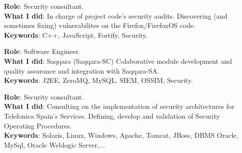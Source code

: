 \documentclass[]{resume}
\begin{document}
\begin{minipage}[t]{0.66\textwidth}
\textbf{Role}: Security consultant.\\
\textbf{What I did}: In charge of project code's security audits. Discovering (and sometimes fixing) vulnerabilites on the Firefox/FirefoxOS code.\\
\textbf{Keywords}: C++, JavaScript, Fortify, Security.
\sectionsep

\textbf{Role}: Software Engineer.\\
\textbf{What I did}: Saqqara (Saqqara-SC) Colaborative module development and quality assurance and integration with Saqqara-SA.\\
\textbf{Keywords}: J2EE, ZeroMQ, MySQL, SIEM, OSSIM, Security.
\sectionsep

\textbf{Role}: Security consultant.\\
\textbf{What I did}: Consulting on the implementation of security architectures for Telefonica Spain's Services. Defining, develop and validation of Security Operating Procedures.\\
\textbf{Keywords}: Solaris, Linux, Windows, Apache, Tomcat, JBoss, DBMS Oracle, MySql, Oracle Weblogic Server,...
\sectionsep

\end{minipage}
\hfill
\end{document}
